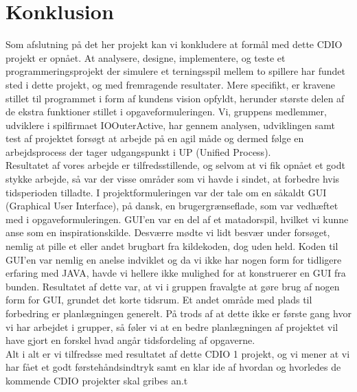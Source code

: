 \chapter{Konklusion}
Som afslutning på det her projekt kan vi konkludere at formål med dette CDIO projekt er opnået. At analysere, designe, implementere, og teste et programmeringsprojekt der simulere et terningsspil mellem to spillere har fundet sted i dette projekt, og med fremragende resultater. Mere specifikt, er kravene stillet til programmet i form af kundens vision opfyldt, herunder største delen af de ekstra funktioner stillet i opgaveformuleringen. Vi, gruppens medlemmer, udviklere i spilfirmaet IOOuterActive, har gennem analysen, udviklingen samt test af projektet forsøgt at arbejde på en agil måde og dermed følge en arbejdsprocess der tager udgangspunkt i UP (Unified Process). \\

Resultatet af vores arbejde er tilfredsstillende, og selvom at vi fik opnået et godt stykke arbejde, så var der visse områder som vi havde i sindet, at forbedre hvis tidsperioden tilladte. I projektformuleringen var der tale om en såkaldt GUI (Graphical User Interface), på dansk, en brugergrænseflade, som var vedhæftet med i opgaveformuleringen. GUI’en var en del af et matadorspil, hvilket vi kunne anse som en inspirationskilde. Desværre mødte vi lidt besvær under forsøget, nemlig at pille et eller andet brugbart fra kildekoden, dog uden held. Koden til GUI’en var nemlig en anelse indviklet og da vi ikke har nogen form for tidligere erfaring med JAVA, havde vi hellere ikke mulighed for at konstruerer en GUI fra bunden. Resultatet af dette var, at vi i gruppen fravalgte at gøre brug af nogen form for GUI, grundet det korte tidsrum. Et andet område med plads til forbedring er planlægningen generelt. På trods af at dette ikke er første gang hvor vi har arbejdet i grupper, så føler vi at en bedre planlægningen af projektet vil have gjort en forskel hvad angår tidsfordeling af opgaverne. \\

Alt i alt er vi tilfredsse med resultatet af dette CDIO 1 projekt, og vi mener at vi har fået et godt førstehåndsindtryk samt en klar ide af hvordan og hvorledes de kommende CDIO projekter skal gribes an.t